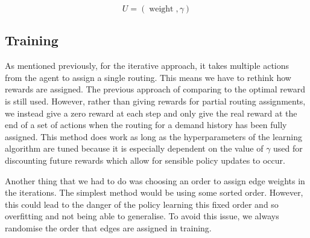 \begin{equation}
  \label{equation:global_outputs}
  U = (\operatorname{weight}, \gamma)
\end{equation}

\subsection{Training}
As mentioned previously, for the iterative approach, it takes multiple actions from the agent to assign a single routing. This means we have to rethink how rewards are assigned. The previous approach of comparing to the optimal reward is still used. However, rather than giving rewards for partial routing assignments, we instead give a zero reward at each step and only give the real reward at the end of a set of actions when the routing for a demand history has been fully assigned. This method does work as long as the hyperparameters of the learning algorithm are tuned because it is especially dependent on the value of $\gamma$ used for discounting future rewards which allow for sensible policy updates to occur.

Another thing that we had to do was choosing an order to assign edge weights in the iterations. The simplest method would be using some sorted order. However, this could lead to the danger of the policy learning this fixed order and so overfitting and not being able to generalise. To avoid this issue, we always randomise the order that edges are assigned in training.

